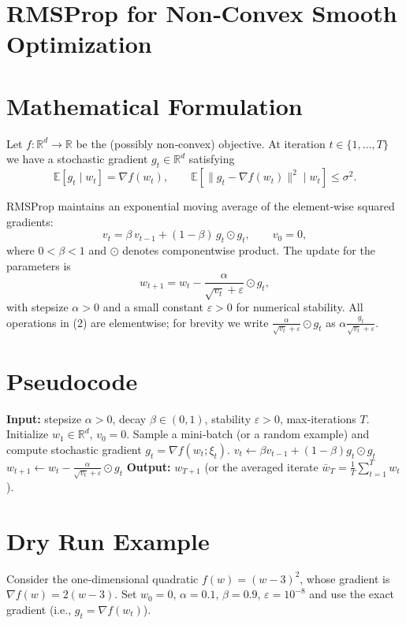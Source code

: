 \documentclass{article}
\newcommand{\E}{\mathbb{E}}
\newcommand{\R}{\mathbb{R}}
\begin{document}
\section*{RMSProp for Non‑Convex Smooth Optimization}

\section*{Mathematical Formulation}
Let $f:\R^{d}\rightarrow\R$ be the (possibly non‑convex) objective.  
At iteration $t\in\{1,\dots,T\}$ we have a stochastic gradient $g_{t}\in\R^{d}$ satisfying
\[
\E\!\left[g_{t}\mid w_{t}\right]=\nabla f(w_{t}),\qquad
\E\!\left[\|g_{t}-\nabla f(w_{t})\|^{2}\mid w_{t}\right]\le\sigma^{2}.
\]

RMSProp maintains an exponential moving average of the element‑wise squared gradients:
\[
v_{t}= \beta\,v_{t-1}+(1-\beta)\,g_{t}\odot g_{t},\qquad v_{0}=0,
\tag{1}
\]
where $0<\beta<1$ and $\odot$ denotes componentwise product.  
The update for the parameters is
\[
w_{t+1}=w_{t}-\frac{\alpha}{\sqrt{v_{t}}+\varepsilon}\odot g_{t},
\tag{2}
\]
with stepsize $\alpha>0$ and a small constant $\varepsilon>0$ for numerical stability.  
All operations in (2) are elementwise; for brevity we write $\frac{\alpha}{\sqrt{v_{t}}+\varepsilon}\odot g_{t}$
as $\displaystyle \alpha\frac{g_{t}}{\sqrt{v_{t}}+\varepsilon}$.

\section*{Pseudocode}
\begin{algorithm}[H]
\caption{RMSProp (non‑convex setting)}\label{alg:rmsprop}
\begin{algorithmic}[1]
\STATE \textbf{Input:} stepsize $\alpha>0$, decay $\beta\in(0,1)$, stability $\varepsilon>0$, 
       max‑iterations $T$.
\STATE Initialize $w_{1}\in\R^{d}$, $v_{0}=0$.
    \STATE Sample a mini‑batch (or a random example) and compute stochastic gradient $g_{t}=\nabla f(w_{t};\xi_{t})$.
    \STATE $v_{t}\gets\beta v_{t-1}+(1-\beta)g_{t}\odot g_{t}$ \hfill{}
    \STATE $w_{t+1}\gets w_{t}-\displaystyle\frac{\alpha}{\sqrt{v_{t}}+\varepsilon}\odot g_{t}$ \hfill{}
\ENDFOR
\STATE \textbf{Output:} $w_{T+1}$ (or the averaged iterate $\bar w_T=\tfrac1T\sum_{t=1}^{T}w_t$).
\end{algorithmic}
\end{algorithm}

\section*{Dry Run Example}
Consider the one‑dimensional quadratic $f(w)=(w-3)^{2}$, whose gradient is $\nabla f(w)=2(w-3)$.  
Set $w_{0}=0$, $\alpha=0.1$, $\beta=0.9$, $\varepsilon=10^{-8}$ and use the exact gradient (i.e., $g_{t}=\nabla f(w_{t})$).  
\end{document}
